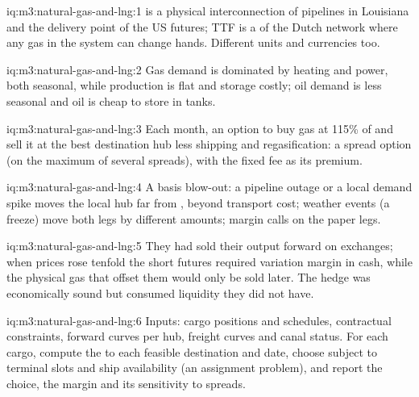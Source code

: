 \begin{solution}{iq:m3:natural-gas-and-lng:1}
 is a physical interconnection of pipelines in Louisiana and the delivery point
of the US futures; TTF is a  of the Dutch network where any gas in
the system can change hands. Different units and currencies too.
\end{solution}

\begin{solution}{iq:m3:natural-gas-and-lng:2}
Gas demand is dominated by heating and power, both seasonal, while production is flat
and storage costly; oil demand is less seasonal and oil is cheap to store in tanks.
\end{solution}

\begin{solution}{iq:m3:natural-gas-and-lng:3}
Each month, an option to buy gas at 115\% of  and sell it at the best
destination hub less shipping and regasification: a spread option (on the maximum of
several spreads), with the fixed fee as its premium.
\end{solution}

\begin{solution}{iq:m3:natural-gas-and-lng:4}
A basis blow-out: a pipeline outage or a local demand spike moves the local hub far from
, beyond transport cost; weather events (a freeze) move both legs by different
amounts; margin calls on the paper legs.
\end{solution}

\begin{solution}{iq:m3:natural-gas-and-lng:5}
They had sold their output forward on exchanges; when prices rose tenfold the short
futures required variation margin in cash, while the physical gas that offset them would
only be sold later. The hedge was economically sound but consumed liquidity they did not
have.
\end{solution}

\begin{solution}{iq:m3:natural-gas-and-lng:6}
Inputs: cargo positions and schedules, contractual constraints, forward curves per hub,
freight curves and canal status. For each cargo, compute the  to each feasible
destination and date, choose subject to terminal slots and ship availability (an
assignment problem), and report the choice, the margin and its sensitivity to spreads.
\end{solution}
